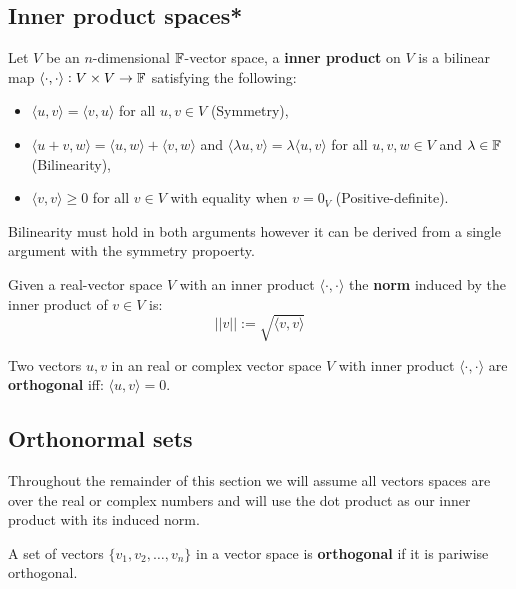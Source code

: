 \documentclass[../Year1.tex]{subfiles}
\begin{document}
\subsection{Inner product spaces*}

\begin{definition}
    Let $V$ be an $n$-dimensional $\mathbb{F}$-vector space, a \textbf{inner product} on $V$ is a bilinear map $\langle\cdot,\cdot\rangle: V \times V \rightarrow \mathbb{F}$ satisfying the following: \begin{itemize}
        \item $\langle u,v \rangle=\langle v,u \rangle$ for all $u,v\in V$ (Symmetry),
        \item $\langle u+v,w \rangle=\langle u,w \rangle+\langle v,w \rangle$ and $\langle \lambda u,v \rangle=\lambda\langle u,v \rangle$ for all $u,v,w\in V$ and $\lambda\in\mathbb{F}$ (Bilinearity),
        \item $\langle v,v \rangle\geq 0$ for all $v\in V$ with equality when $v=0_V$ (Positive-definite).
    \end{itemize}
    Bilinearity must hold in both arguments however it can be derived from a single argument with the symmetry propoerty.
\end{definition}

\begin{definition}[Norm]
    Given a real-vector space $V$ with an inner product $\langle\cdot,\cdot\rangle$ the \textbf{norm} induced by the inner product of $v\in V$ is: \[
        ||v|| := \sqrt{\langle v,v\rangle}
    \]
\end{definition}

\begin{definition}[Orthogonality]
    Two vectors $u,v$ in an real or complex vector space $V$  with inner product $\langle\cdot,\cdot\rangle$ are \textbf{orthogonal} iff: $\langle u, v\rangle=0$.
\end{definition}

\subsection{Orthonormal sets}
Throughout the remainder of this section we will assume all vectors spaces are over the real or complex numbers and will use the dot product as our inner product with its induced norm.

\begin{definition}
    A set of vectors $\{v_1,v_2,\ldots,v_n\}$ in a vector space is \textbf{orthogonal} if it is pariwise orthogonal.
\end{definition}
\end{document}
